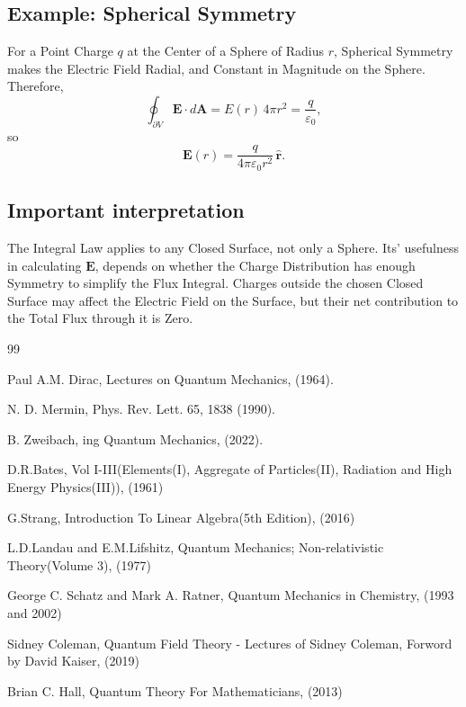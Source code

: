 \documentclass[a4paper, 10pt, onepage]{elegantbook}
\begin{document}
{\subsection{Example: Spherical Symmetry}

For a Point Charge \(q\) at the Center of a Sphere of Radius \(r\), Spherical Symmetry makes the Electric Field Radial, 
and Constant in Magnitude on the Sphere. Therefore,
\[
\oint_{\partial V}\mathbf{E}\cdot d\mathbf{A}
=E(r)\,4\pi r^2
=\frac{q}{\varepsilon_0},
\]
so
\[
\mathbf{E}(r)
=\frac{q}{4\pi\varepsilon_0r^2}\,\hat{\mathbf{r}}.
\]

\subsection{Important interpretation}

The Integral Law applies to any Closed Surface, not only a Sphere. Its' usefulness in calculating \(\mathbf{E}\), 
depends on whether the Charge Distribution has enough Symmetry to simplify the Flux Integral. 
Charges outside the chosen Closed Surface may affect the Electric Field on the Surface, but their net contribution to 
the Total Flux
through it is Zero.

\begin{thebibliography}{99}

Paul A.M. Dirac, Lectures on Quantum Mechanics, (1964).

N. D. Mermin,  Phys. Rev. Lett. 65, 1838 (1990).

B. Zweibach, ing Quantum Mechanics, (2022).

D.R.Bates, Vol I-III(Elements(I), Aggregate of Particles(II), Radiation and High Energy Physics(III)), (1961)

G.Strang, Introduction To Linear Algebra(5th Edition), (2016)

L.D.Landau and E.M.Lifshitz, Quantum Mechanics; Non-relativistic Theory(Volume 3), (1977)

George C. Schatz and Mark A. Ratner, Quantum Mechanics in Chemistry, (1993 and 2002)

Sidney Coleman, Quantum Field Theory - Lectures of Sidney Coleman, Forword by David Kaiser, (2019)

Brian C. Hall, Quantum Theory For Mathematicians, (2013)

\end{thebibliography}

}
\end{document}
